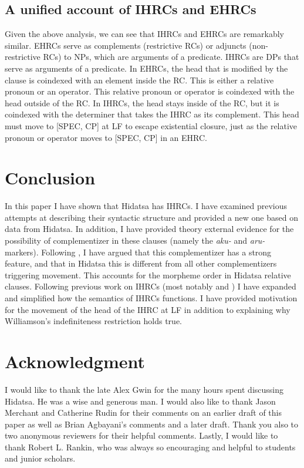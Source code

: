 \documentclass[output=paper]{LSP/langsci}
\begin{document}
\subsection{A unified account of IHRCs and EHRCs}

Given the above analysis, we can see that IHRCs and EHRCs are remarkably similar. EHRCs serve as complements (restrictive RCs) or adjuncts (non-restrictive RCs) to NPs, which are arguments of a predicate. IHRCs are DPs that serve as arguments of a predicate. In EHRCs, the head that is modified by the clause is coindexed with an element inside the RC. This is either a relative pronoun or an operator. This relative pronoun or operator is coindexed with the head outside of the RC. In IHRCs, the head stays inside of the RC, but it is coindexed with the determiner that takes the IHRC as its complement. This head must move to [SPEC, CP] at LF to escape existential closure, just as the relative pronoun or operator moves to [SPEC, CP] in an EHRC.

\section{Conclusion} 

In this paper I have shown that Hidatsa has IHRCs. I have examined previous attempts at describing their syntactic structure and provided a new one based on data from Hidatsa. In addition, I have provided theory external evidence for the possibility of complementizer in these clauses (namely the \textit{aku-} and \textit{aru-} markers). Following \citet{Culy1990}, I have argued that this complementizer has a strong feature, and that in Hidatsa this is different from all other complementizers triggering movement. This accounts for the morpheme order in Hidatsa relative clauses.  Following previous work on IHRCs (most notably \citealt{Williamson1987} and \citealt{Culy1990}) I have expanded and simplified how the semantics of IHRCs functions. I have provided motivation for the movement of the head of the IHRC at LF in addition to explaining why Williamson's indefiniteness restriction holds true.

\section*{Acknowledgment}

I would like to thank the late Alex Gwin for the many hours spent discussing Hidatsa. He was a wise and generous man. I would also like to thank Jason Merchant and Catherine Rudin for their comments on an earlier draft of this paper as well as Brian Agbayani's comments and a later draft. Thank you also to two anonymous reviewers for their helpful comments. Lastly, I would like to thank Robert L. Rankin, who was always so encouraging and helpful to students and junior scholars.
\end{document}
